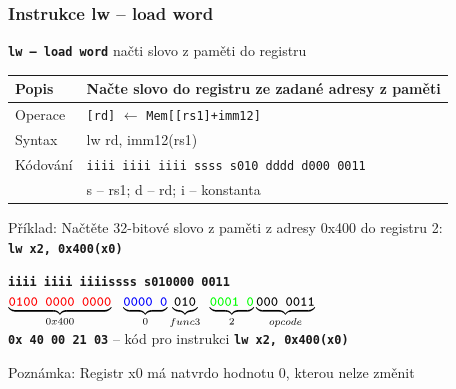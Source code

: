 \documentclass{beamer}
\begin{document}
\begin{frame}
\frametitle{Instrukce lw -- load word}

\textbf{\texttt{lw -- load word}} načti slovo z paměti do registru

\begin{tabular}{|l|l|}\hline
Popis & Načte slovo do registru ze zadané adresy z paměti \\ \hline
Operace & \texttt{[rd]} $\leftarrow$ \texttt{Mem[[rs1]+imm12]} \\ \hline
Syntax & lw rd, imm12(rs1) \\ \hline
Kódování & \texttt{iiii iiii iiii ssss s010 dddd d000 0011} \\ \hline
 & s -- rs1; d -- rd; i -- konstanta \\ \hline
\end{tabular}

\bigskip

Příklad: Načtěte 32-bitové slovo z paměti z adresy 0x400 do registru 2:\\
\textbf{\texttt{lw x2, 0x400(x0)}}

\textbf{\texttt{\color{red}iiii iiii iiii}}\phantom{xx}\textbf{\texttt{\color{blue}ssss s}}\hspace{0.1cm}\textbf{\texttt{010\hspace{0.05cm}000 0011}}\\
$\underbrace{\textbf{\texttt{\color{red}0100 0000 0000}}}_{0x400}\texttt{ }\underbrace{\textbf{\texttt{\color{blue}0000 0}}}_{0}\underbrace{\textbf{\texttt{010}}}_{func3}\phantom{i}\underbrace{\textbf{\texttt{\color{green}0001 0}}}_{2}\underbrace{\textbf{\texttt{000 0011}}}_{opcode}$\\

\textbf{\texttt{0x 40 00 21 03}} -- kód pro instrukci \textbf{\texttt{lw x2, 0x400(x0)}}

Poznámka: Registr x0 má natvrdo hodnotu 0, kterou nelze změnit

\end{frame}
\end{document}
